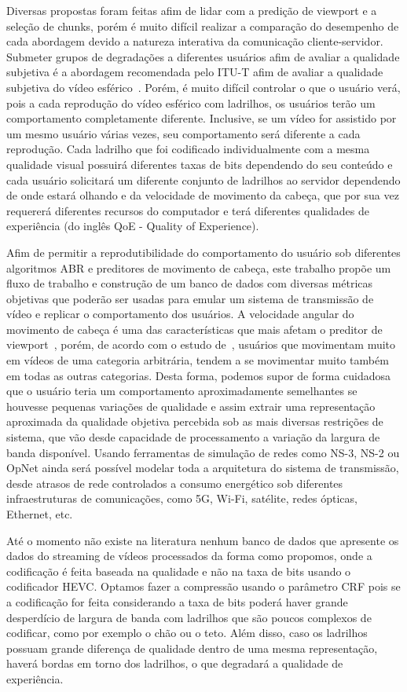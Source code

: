 Diversas propostas foram feitas afim de lidar com a predição de viewport e a seleção de chunks, porém é muito difícil realizar a comparação do desempenho de cada abordagem devido a natureza interativa da comunicação cliente-servidor. Submeter grupos de degradações a diferentes usuários afim de avaliar a qualidade subjetiva é a abordagem  recomendada pelo ITU-T afim de avaliar a qualidade subjetiva do vídeo esférico~\cite{ITU-ITU-TRecommendationP.9192020}. Porém, é muito difícil controlar o que o usuário verá, pois a cada reprodução do vídeo esférico com ladrilhos, os usuários terão um comportamento completamente diferente. Inclusive, se um vídeo for assistido por um mesmo usuário várias vezes, seu comportamento será diferente a cada reprodução. Cada ladrilho que foi codificado individualmente com a mesma qualidade visual possuirá diferentes taxas de bits dependendo do seu conteúdo e cada usuário solicitará um diferente conjunto de ladrilhos ao servidor dependendo de onde estará olhando e da velocidade de movimento da cabeça, que por sua vez requererá diferentes recursos do computador e terá diferentes qualidades de experiência (do inglês QoE - Quality of Experience).

Afim de permitir a reprodutibilidade do comportamento do usuário sob diferentes algoritmos ABR e preditores de movimento de cabeça, este trabalho propõe um fluxo de trabalho e construção de um banco de dados com diversas métricas objetivas que poderão ser usadas para emular um sistema de transmissão de vídeo e replicar o comportamento dos usuários. A velocidade angular do movimento de cabeça é uma das características que mais afetam o preditor de viewport~\cite{Qian2016}, porém, de acordo com o estudo de~\cite{Nasrabadi2019}, usuários que movimentam muito em vídeos de uma categoria arbitrária, tendem a se movimentar muito também em todas as outras categorias. Desta forma, podemos supor de forma cuidadosa que o usuário teria um comportamento aproximadamente semelhantes se houvesse pequenas variações de qualidade e assim extrair uma representação aproximada da qualidade objetiva percebida sob as mais diversas restrições de sistema, que vão desde capacidade de processamento a variação da largura de banda disponível. Usando ferramentas de simulação de redes como NS-3, NS-2 ou OpNet ainda será possível modelar toda a arquitetura do sistema de transmissão, desde atrasos de rede controlados a consumo energético sob diferentes infraestruturas de comunicações, como 5G, Wi-Fi, satélite, redes ópticas, Ethernet, etc.

Até o momento não existe na literatura nenhum banco de dados que apresente os dados do streaming de vídeos processados da forma como propomos, onde a codificação é feita baseada na qualidade e não na taxa de bits usando o codificador HEVC. Optamos fazer a compressão usando o parâmetro CRF pois se a codificação for feita considerando a taxa de bits poderá haver grande desperdício de largura de banda com ladrilhos que são poucos complexos de codificar, como por exemplo o chão ou o teto. Além disso, caso os ladrilhos possuam grande diferença de qualidade dentro de uma mesma representação, haverá bordas em torno dos ladrilhos, o que degradará a qualidade de experiência.

